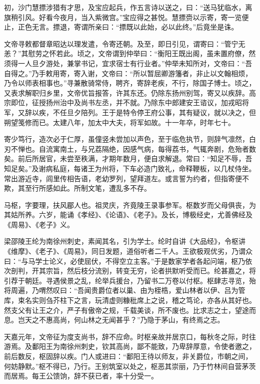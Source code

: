 \documentclass[]{article}
\begin{document}
初，沙门慧摽涉猎有才思，及宝应起兵，作五言诗以送之，曰：``送马犹临水，离旗稍引风。好看今夜月，当入紫微宫。''宝应得之甚悦。慧摽赍以示寄，寄一览便止，正色无言。摽退，寄谓所亲曰：``摽既以此始，必以此终。''后竟坐是诛。

文帝寻敕都督章昭达以理发遣，令寄还朝。及至，即日引见，谓寄曰：``管宁无恙？''其慰劳之怀若此。顷之，文帝谓到仲举曰：``衡阳王既出阁，虽未置府僚，然须得一人旦夕游处，兼掌书记，宜求宿士有行业者。''仲举未知所对，文帝曰：``吾自得之。''乃手敕用寄，寄入谢，文帝曰：``所以暂屈卿游籓者，非止以文翰相烦，乃令以师表相事也。''寻兼散骑常侍，聘齐，寄辞老疾，不行，除国子博士。顷之，又表求解职归乡里，文帝优旨报答，许其东还。仍除东扬州别驾，寄又以疾辞。高宗即位，征授扬州治中及尚书左丞，并不就。乃除东中郎建安王谘议，加戎昭将军，又辞以疾，不任旦夕陪列。王于是特令停王府公事，其有疑议，就以决之，但朔望笺修而已。太建八年，加太中大夫，将军如故。十一年卒，时年七十。

寄少笃行，造次必于仁厚，虽僮竖未尝加以声色，至于临危执节，则辞气凛然，白刃不惮也。自流寓南土，与兄荔隔绝，因感气病，每得荔书，气辄奔剧，危殆者数矣。前后所居官，未尝至秩满，才期年数月，便自求解退。常曰：``知足不辱，吾知足矣。''及谢病私庭，每诸王为州将，下车必造门致礼，命释鞭板，以几杖侍坐。常出游近寺，闾里传相告语，老幼罗列，望拜道左。或言誓为约者，但指寄便不欺，其至行所感如此。所制文笔，遭乱多不存。

马枢，字要理，扶风郿人也。祖灵庆，齐竟陵王录事参军。枢数岁而父母俱丧，为其姑所养。六岁，能诵《孝经》、《论语》、《老子》。及长，博极经史，尤善佛经及《周易》、《老子》义。

梁邵陵王纶为南徐州刺史，素闻其名，引为学士。纶时自讲《大品经》，令枢讲《维摩》、《老子》、《周易》，同日发题，道俗听者二千人。王欲极观优劣，乃谓众曰：``与马学士论义，必使屈伏，不得空立主客。''于是数家学者各起问端，枢乃依次剖判，开其宗旨，然后枝分流别，转变无穷，论者拱默听受而已。纶甚嘉之，将引荐于朝廷。寻遇侯景之乱，纶举兵援台，乃留书二万卷以付枢。枢肆志寻览，殆将周遍，乃喟然叹曰：``吾闻贵爵位者以巢、由为桎梏，爱山林者以伊、吕为管库，束名实则刍芥柱下之言，玩清虚则糠秕席上之说，稽之笃论，亦各从其好也。然支父有让王之介，严子有傲帝之规，千载美谈，所不废也。比求志之士，望途而息。岂天之不惠高尚，何山林之无闻甚乎？''乃隐于茅山，有终焉之志。

天嘉元年，文帝征为度支尚书，辞不应命。时枢亲故并居京口，每秋冬之际，时往游焉。及鄱阳王为南徐州刺史，钦其高尚，鄙不能致，乃卑辞厚意，令使者邀之，前后数反，枢固辞以疾。门人或进曰：``鄱阳王待以师友，非关爵位，市朝之间，何妨静默。''枢不得已，乃行。王别筑室以处之，枢恶其崇丽，乃于竹林间自营茅茨而居焉。每王公馈饷，辞不获已者，率十分受一。
\end{document}
